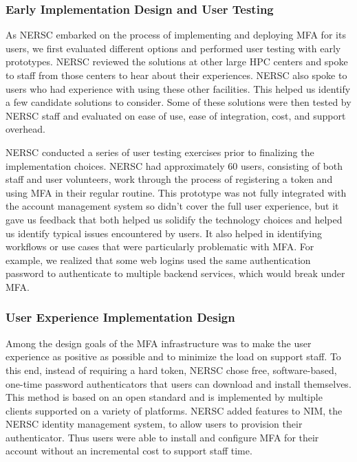 \documentclass[sigconf,review]{acmart}
\begin{document}
\subsubsection{Early Implementation Design and User Testing}
\label{early}

As NERSC embarked on the process of implementing and deploying MFA for its
users, we first evaluated different options and performed user testing with
early prototypes.  NERSC reviewed the solutions at other large HPC centers and
spoke to staff from those centers to hear about their experiences.  NERSC also
spoke to users who had experience with using these other facilities.  This
helped us identify a few candidate solutions to consider.  Some of these
solutions were then tested by NERSC staff and evaluated on ease of use, ease of
integration, cost, and support overhead.

NERSC conducted a series of user testing exercises prior to finalizing the
implementation choices.  NERSC had approximately 60 users, consisting of both
staff and user volunteers, work through the process of registering a token and
using MFA in their regular routine.  This prototype was not fully integrated
with the account management system so didn't cover the full user experience, but
it gave us feedback that both helped us solidify the technology choices and
helped us identify typical issues encountered by users.  It also helped in
identifying workflows or use cases that were particularly problematic with MFA.
For example, we realized that some web logins used the same authentication
password to authenticate to multiple backend services, which would break under
MFA.

\subsubsection{User Experience Implementation Design}
\label{user}

Among the design goals of the MFA infrastructure was to make the user experience
as positive as possible and to minimize the load on support staff. To this end,
instead of requiring a hard token, NERSC chose free, software-based, one-time
password authenticators \cite{m2011totp} that users can download and install
themselves. This method is based on an open standard and is implemented by
multiple clients supported on a variety of platforms.  NERSC added features to
NIM, the NERSC identity management system, to allow users to provision their
authenticator. Thus users were able to install and configure MFA for their
account without an incremental cost to support staff time.
\end{document}
